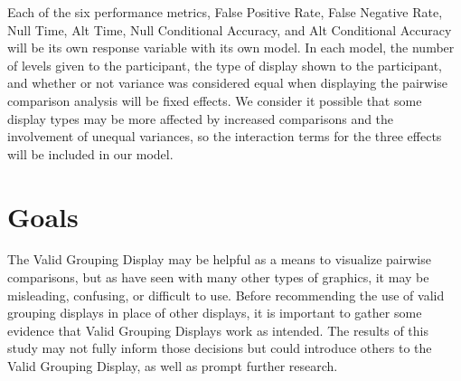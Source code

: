 \documentclass{article}
\begin{document}
Each of the six performance metrics, False Positive Rate, False Negative Rate, Null Time, Alt Time, Null Conditional Accuracy, and Alt Conditional Accuracy will be its own response variable with its own model. In each model, the number of levels given to the participant, the type of display shown to the participant, and whether or not variance was considered equal when displaying the pairwise comparison analysis will be fixed effects. We consider it possible that some display types may be more affected by increased comparisons and the involvement of unequal variances, so the interaction terms for the three effects will be included in our model. 

\section{Goals}

The Valid Grouping Display may be helpful as a means to visualize pairwise comparisons, but as have seen with many other types of graphics, it may be misleading, confusing, or difficult to use. Before recommending the use of valid grouping displays in place of other displays, it is important to gather some evidence that Valid Grouping Displays work as intended. The results of this study may not fully inform those decisions but could introduce others to the Valid Grouping Display, as well as prompt further research.





\end{document}
